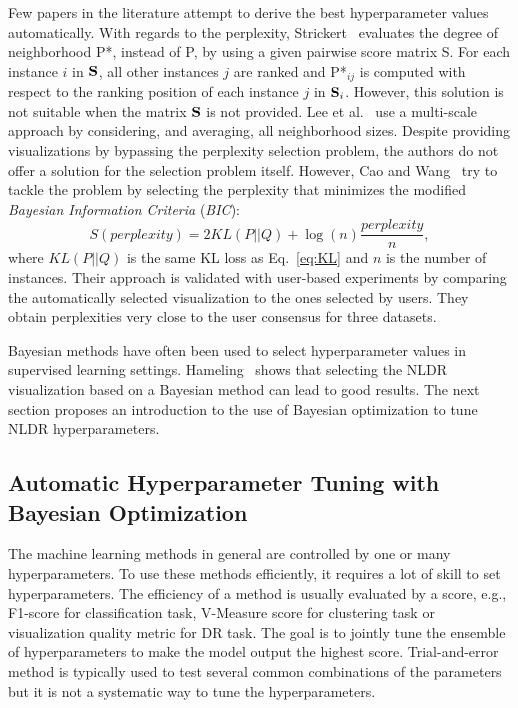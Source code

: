 Few papers in the literature attempt to derive the best hyperparameter values automatically.
With regards to the perplexity, Strickert~\cite{strickert2012} evaluates the degree of neighborhood P*, instead of P, by using a given pairwise score matrix S. For each instance $i$ in ${\bf S}$, all other instances $j$ are ranked and {P*}$_{ij}$ is computed with respect to the ranking position of each instance $j$ in ${\bf S}_i$. However, this solution is not suitable when the matrix ${\bf S}$ is not provided.
Lee et al.~\cite{lee2014} use a multi-scale approach by considering, and averaging, all neighborhood sizes. Despite providing visualizations by bypassing the perplexity selection problem, the authors do not offer a solution for the selection problem itself.
However, Cao and Wang~\cite{cao2017automatic} try to tackle the problem by selecting the perplexity that minimizes the modified \emph{Bayesian Information Criteria} (\emph{BIC}):
\begin{equation}
S(\textit{perplexity}) = 2KL(P||Q) + \log(n)\frac{\textit{perplexity}}{n},
\end{equation}
where $KL(P||Q)$ is the same KL loss as Eq.~\ref{eq:KL} and $n$ is the number of instances.
Their approach is validated with user-based experiments by comparing the automatically selected visualization to the ones selected by users. They obtain perplexities very close to the user consensus for three datasets.

Bayesian methods have often been used to select hyperparameter values in supervised learning settings. Hameling~\cite{harmeling2007exploring} shows that selecting the NLDR visualization based on a Bayesian method can lead to good results. The next section proposes an introduction to the use of Bayesian optimization to tune NLDR hyperparameters.

\subsection{Automatic Hyperparameter Tuning with Bayesian Optimization}\label{subsec:tune_with_BayOpt}


The machine learning methods in general are controlled by one or many hyperparameters.
To use these methods efficiently, it requires a lot of skill to set hyperparameters.
The efficiency of a method is usually evaluated by a score,
e.g., F1-score for classification task, V-Measure score for clustering task or
visualization quality metric for DR task.
The goal is to jointly tune the ensemble of hyperparameters to
make the model output the highest score.
Trial-and-error method is typically used to test several common combinations of the parameters
but it is not a systematic way to tune the hyperparameters.

